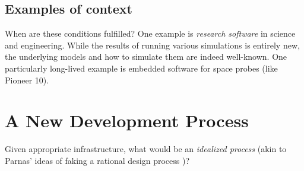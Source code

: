 \documentclass[a4paper,UKenglish,cleveref,autoref,thm-restate]{oasics-v2021}
\begin{document}
\subsection{Examples of context}
\label{subsec:examples-of-context}

When are these conditions fulfilled? One example is \emph{research software} in
science and engineering. While the results of running various simulations is
entirely new, the underlying models and how to simulate them are indeed
well-known. One particularly long-lived example is embedded software for space
probes (like Pioneer 10).

\section{A New Development Process}
\label{sec:a-new-development-process}

Given appropriate infrastructure, what would be an \emph{idealized process}
(akin to Parnas' ideas of faking a rational design process \cite{Parnas1986})?
\end{document}
